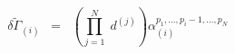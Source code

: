 \begin{equation}
\delta {\tilde{\Gamma}}_{(i)} \;\; = \;\; \left( \prod_{j=1}^{N} \;
d^{(j)} \right) \alpha_{(i)}^{p_1 ,..., p_i -1,..., p_N }
\label{eq:2.3}
\end{equation}

